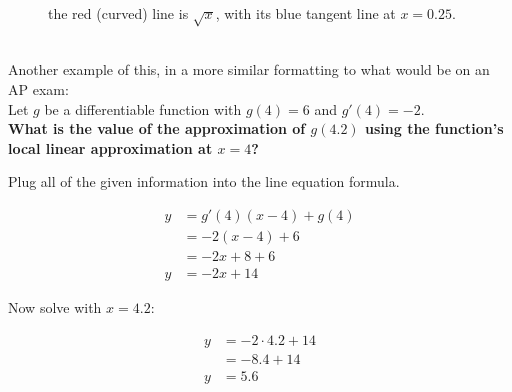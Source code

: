 \documentclass[12pt]{article}
\begin{document}
            \begin{figure}[h]
                \begin{center}
                    \caption{the red (curved) line is $\sqrt{x}$, with its blue tangent line at $x=0.25$.}
                    \label{fig:locallinapprox}
                \end{center}
            \end{figure}
            \\ Another example of this, in a more similar formatting to what would be on an AP exam:
            \\ Let $g$ be a differentiable function with $g(4) = 6$ and $g'(4) = -2$.
            \\ \textbf{What is the value of the approximation of $g(4.2)$ using the function's local linear approximation at $x=4$?}
            \newline \newline
            \centerline{Plug all of the given information into the line equation formula.}
            \begin{align*}
                y &= g'(4)(x-4) + g(4) \\
                &= -2(x-4) + 6 \\
                &= -2x + 8 + 6 \\
                y &= -2x + 14
            \end{align*}
            \centerline{Now solve with $x=4.2$:}
            \begin{align*}
                y &= -2 \cdot 4.2 + 14 \\
                &= -8.4 + 14 \\
                y &= 5.6
            \end{align*}
\end{document}
